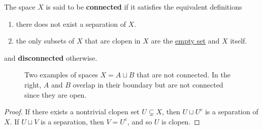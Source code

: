   \begin{definition}
    \label{def:connected-space}
    The space $X$ is said to be \textbf{connected} if it satisfies the equivalent definitions 
    \begin{enumerate}
      \item there does not exist a separation of $X$. 
      \item the only subsets of $X$ that are clopen in $X$ are the \hyperref[st-def:empty-set]{empty set} and $X$ itself. 
    \end{enumerate}
    and \textbf{disconnected} otherwise. 

    \begin{figure}[H]
      \centering 
      \caption{Two examples of spaces $X = A \sqcup B$ that are not connected. In the right, $A$ and $B$ overlap in their boundary but are not connected since they are open. } 
      \label{fig:separation}
    \end{figure}
  \end{definition}
  \begin{proof}
    If there exists a nontrivial clopen set $U \subsetneq X$, then $U \sqcup U^c$ is a separation of $X$. If $U \sqcup V$ is a separation, then $V = U^c$, and so $U$ is clopen. 
  \end{proof} 

